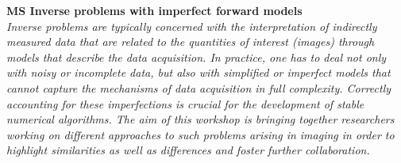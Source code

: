   \noindent\textbf{MS Inverse problems with imperfect forward models}\\
  \textit{Inverse problems are typically concerned with the interpretation of indirectly measured data that are related to the quantities of interest (images) through models that describe the data acquisition. In practice, one has to deal not only with noisy or incomplete data, but also with simplified or imperfect models that cannot capture the mechanisms of data acquisition in full complexity. Correctly accounting for these imperfections is crucial for the development of stable numerical algorithms. The aim of this workshop is bringing together researchers working on different approaches to such problems arising in imaging in order to highlight similarities as well as differences and foster further collaboration.} \\
    
